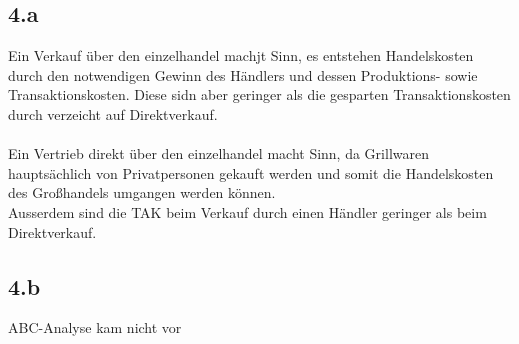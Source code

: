 \subsection*{4.a}
    Ein Verkauf über den einzelhandel machjt Sinn, es entstehen Handelskosten durch den notwendigen Gewinn des Händlers und dessen Produktions- sowie Transaktionskosten. Diese sidn aber geringer als die gesparten Transaktionskosten durch verzeicht auf Direktverkauf. \\
    \ \\
    Ein Vertrieb direkt über den einzelhandel macht Sinn, da Grillwaren hauptsächlich von Privatpersonen gekauft werden und somit die Handelskosten des Großhandels umgangen werden können. \\
    Ausserdem sind die TAK beim Verkauf durch einen Händler geringer als beim Direktverkauf.

\subsection*{4.b}
    ABC-Analyse kam nicht vor